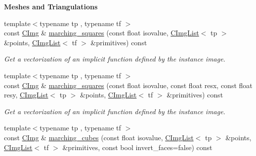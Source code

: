 \begin{Indent}{\bf Meshes and Triangulations}\par
{\em \label{_amgrp03d6c1850a841724b5eac8672e093798}
 }\begin{DoxyCompactItemize}
\item 
\hypertarget{structcimg__library_1_1_c_img_a0df9232fe93ebb8958532b48f8b2fb9f}{
{\footnotesize template$<$typename tp , typename tf $>$ }\\const \hyperlink{structcimg__library_1_1_c_img}{CImg} \& \hyperlink{structcimg__library_1_1_c_img_a0df9232fe93ebb8958532b48f8b2fb9f}{marching\_\-squares} (const float isovalue, \hyperlink{structcimg__library_1_1_c_img_list}{CImgList}$<$ tp $>$ \&points, \hyperlink{structcimg__library_1_1_c_img_list}{CImgList}$<$ tf $>$ \&primitives) const }
\label{structcimg__library_1_1_c_img_a0df9232fe93ebb8958532b48f8b2fb9f}

\begin{DoxyCompactList}\small\item\em Get a vectorization of an implicit function defined by the instance image. \item\end{DoxyCompactList}\item 
{\footnotesize template$<$typename tp , typename tf $>$ }\\const \hyperlink{structcimg__library_1_1_c_img}{CImg} \& \hyperlink{structcimg__library_1_1_c_img_a83741abce6ab182d7bdeb39213e13a7c}{marching\_\-squares} (const float isovalue, const float resx, const float resy, \hyperlink{structcimg__library_1_1_c_img_list}{CImgList}$<$ tp $>$ \&points, \hyperlink{structcimg__library_1_1_c_img_list}{CImgList}$<$ tf $>$ \&primitives) const 
\begin{DoxyCompactList}\small\item\em Get a vectorization of an implicit function defined by the instance image. \item\end{DoxyCompactList}\item 
\hypertarget{structcimg__library_1_1_c_img_aed4ff0cb25b47ed22666b426398fe602}{
{\footnotesize template$<$typename tp , typename tf $>$ }\\const \hyperlink{structcimg__library_1_1_c_img}{CImg} \& \hyperlink{structcimg__library_1_1_c_img_aed4ff0cb25b47ed22666b426398fe602}{marching\_\-cubes} (const float isovalue, \hyperlink{structcimg__library_1_1_c_img_list}{CImgList}$<$ tp $>$ \&points, \hyperlink{structcimg__library_1_1_c_img_list}{CImgList}$<$ tf $>$ \&primitives, const bool invert\_\-faces=false) const }
\label{structcimg__library_1_1_c_img_aed4ff0cb25b47ed22666b426398fe602}


\end{DoxyCompactItemize}
\end{Indent}
